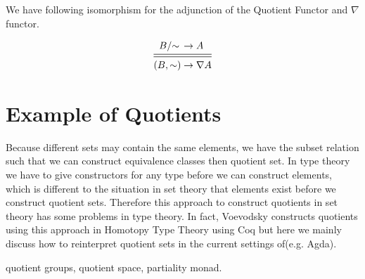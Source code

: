 We have following isomorphism for  the adjunction of the Quotient
Functor and $\nabla$ functor.

\begin{equation*}
\begin{aligned}
\qset{B} & \rightarrow A\\
\midrule
\midrule
(B , \sim) & \rightarrow \nabla A\\
\end{aligned}
\end{equation*}


\section{Example of Quotients}


Because different sets may contain the same elements, we
have the subset relation such that we can construct equivalence
classes then quotient set. 
In type theory we have to give constructors for any type before we can construct elements, which is different to the situation in set theory that
elements exist before we construct quotient sets. Therefore this approach to construct quotients in set
theory has some problems in type theory. In fact, Voevodsky constructs
quotients using this approach in Homotopy Type Theory using Coq
\cite{voe:hset} but here we
mainly discuss how to reinterpret quotient sets in the current settings of\itt(e.g. Agda).



quotient groups, quotient space, partiality monad.